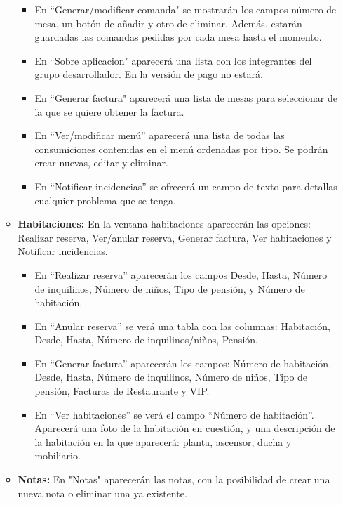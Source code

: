 \documentclass[spanish,a4paper,11pt, twoside]{report}	%
\begin{document}
\begin{itemize}
\begin{itemize}
\begin{itemize}
						\item En “Generar/modificar comanda" se mostrarán los campos número de mesa, un botón de añadir y otro de eliminar. Además, estarán guardadas las comandas pedidas por cada mesa hasta el momento. 
						\item En “Sobre aplicacion" aparecerá una lista con los integrantes del grupo desarrollador. En la versión de pago no estará.
						\item En “Generar factura" aparecerá una lista de mesas para seleccionar de la que se quiere obtener la factura. 
						\item En “Ver/modificar menú'' aparecerá una lista de todas las consumiciones contenidas en el menú ordenadas por tipo. Se podrán crear nuevas, editar y eliminar. 
						\item En “Notificar incidencias'' se ofrecerá un campo de texto para detallas cualquier problema que se tenga.
					\end{itemize}
					
					 \item \textbf{Habitaciones:} En la ventana habitaciones aparecerán las opciones: Realizar reserva, Ver/anular reserva, Generar factura, Ver habitaciones y Notificar incidencias. 
					\begin{itemize}		
							\item En “Realizar reserva'' aparecerán los campos Desde, Hasta, Número de inquilinos, Número de niños, Tipo de pensión, y Número de habitación.
							\item En “Anular reserva'' se verá una tabla con las columnas: Habitación, Desde, Hasta, Número de inquilinos/niños, Pensión.\\
							\item En “Generar factura'' aparecerán los campos: Número de habitación, Desde, Hasta, Número de inquilinos, Número de niños, Tipo de pensión, Facturas de Restaurante y VIP. \\
							\item En “Ver habitaciones'' se verá el campo “Número de habitación''. Aparecerá una foto de la habitación en cuestión, y una descripción de la habitación en la que aparecerá: planta, ascensor, ducha y mobiliario. 
					\end{itemize}
					 \item \textbf{Notas:} En "Notas" aparecerán las notas, con la posibilidad de crear una nueva nota o eliminar una ya existente.
				\end{itemize}
				

\end{itemize}
\end{document}
